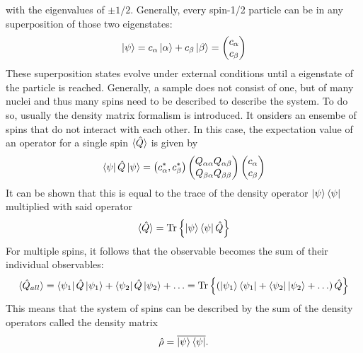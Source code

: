     with the eigenvalues of $\pm 1/2$.
    Generally, every spin-1/2 particle can be in any superposition of those two eigenstates:
    \begin{equation}
        \ket\psi = c_\alpha \ket\alpha + c_\beta \ket \beta = \begin{pmatrix} c_\alpha \\
        c_\beta\end{pmatrix}
    \end{equation}
    These superposition states evolve under external conditions until a eigenstate of the particle
    is reached.
    Generally, a sample does not consist of one, but of many nuclei and thus many spins need to be
    described to describe the system. To do so, usually the density matrix formalism is introduced.
    It onsiders an ensembe of spins that do not interact with each other. In this case, the
    expectation value of an operator for a single spin $\braket{\hat Q}$ is given by
    \begin{equation}
    \bra\psi\hat Q\ket\psi = \left( c_\alpha^*, c_\beta^*\right)
    \begin{pmatrix}
        Q_{\alpha\alpha} Q_{\alpha\beta}\\
        Q_{\beta\alpha} Q_{\beta\beta}
    \end{pmatrix}
    \begin{pmatrix}
        c_\alpha\\
        c_\beta
    \end{pmatrix}
    \end{equation}
    It can be shown that this is equal to the trace of the density operator
    $\ket\psi\bra\psi$multiplied with said operator
    \begin{equation}
        \braket{\hat Q} = \operatorname{Tr} \left\{\ket\psi\bra\psi\hat Q\right\}
    \end{equation}
    For multiple spins, it follows that the observable becomes the sum of their individual
    observables:
    \begin{equation}
        \braket{\hat Q_{all}}= \bra{\psi_1}\hat Q\ket{\psi_1} + \bra{\psi_2}\hat Q\ket{\psi_2} + \hdots =
        \operatorname{Tr}{\left\{\left(\ket{\psi_1}\bra{\psi_1} + \bra{\psi_2}\ket{\psi_2}+ \hdots \right) \hat Q\right\}}
    \end{equation}
    This means that the system of spins can be described by the sum of the density operators called
    the density matrix
    \begin{equation}
        \hat\rho = \overline{\ket\psi\bra\psi}.
    \end{equation}
